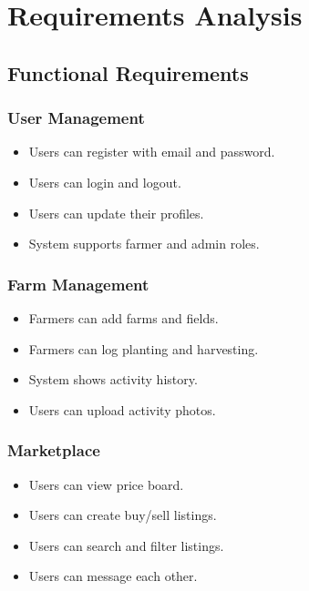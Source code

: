 \section{Requirements Analysis}

\subsection{Functional Requirements}

\subsubsection{User Management}
\begin{itemize}[leftmargin=*]
	\item Users can register with email and password.
	\item Users can login and logout.
	\item Users can update their profiles.
	\item System supports farmer and admin roles.
\end{itemize}

\subsubsection{Farm Management}
\begin{itemize}[leftmargin=*]
	\item Farmers can add farms and fields.
	\item Farmers can log planting and harvesting.
	\item System shows activity history.
	\item Users can upload activity photos.
\end{itemize}

\subsubsection{Marketplace}
\begin{itemize}[leftmargin=*]
	\item Users can view price board.
	\item Users can create buy/sell listings.
	\item Users can search and filter listings.
	\item Users can message each other.
\end{itemize}

